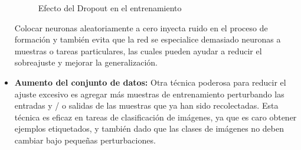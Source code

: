 \begin{itemize}
\begin{figure}[H]
        \caption{Efecto del Dropout en el entrenamiento}
        \label{dropout}
    \end{figure}
    Colocar neuronas aleatoriamente a cero inyecta ruido en el proceso de formación y también evita que la red se especialice demasiado neuronas a muestras o tareas particulares, las cuales pueden ayudar a reducir el sobreajuste y mejorar la generalización.
    \item \textbf{Aumento del conjunto de datos:} Otra técnica poderosa para reducir el ajuste excesivo es agregar más muestras de entrenamiento perturbando las entradas y / o salidas de las muestras que ya han sido recolectadas. Esta técnica es eficaz en tareas de clasificación de imágenes, ya que es caro obtener ejemplos etiquetados, y también dado que las clases de imágenes no deben cambiar bajo pequeñas perturbaciones.
\end{itemize}
